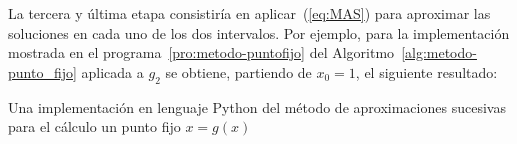 \begin{example}
\begin{itemize}
  \end{itemize}
  La \textsf{tercera y última etapa} consistiría en
  aplicar~(\ref{eq:MAS}) para aproximar las soluciones en cada uno de
  los dos intervalos. Por ejemplo, para la implementación mostrada en
  el programa~\ref{pro:metodo-puntofijo} del
  Algoritmo~\ref{alg:metodo-punto_fijo} aplicada a $g_2$ se obtiene,
  partiendo de $x_0=1$, el siguiente resultado:
  \begin{pythonoutput}
  \end{pythonoutput}
  \label{ex:punto-fijo-1}
  \begin{program}
    \label{pro:metodo-puntofijo}
    \caption{Una implementación en lenguaje Python del método de
      aproximaciones sucesivas para el cálculo un punto fijo $x=g(x)$}
  \end{program}
\end{example}


